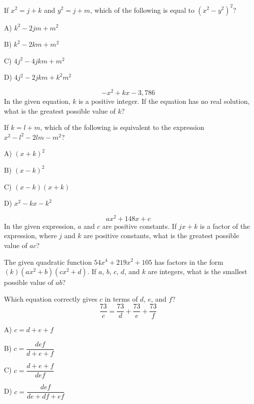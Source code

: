 \vfill
\noindent\begin{minipage}{\linewidth}
\par\smallskip
If $x^2=j+k$ and $y^2=j+m$, which of the following is equal to $(x^2-y^2)^2$?
\begin{satchoices}
  \item[A)] $k^2-2jm+m^2$
  \item[B)] $k^2-2km+m^2$
  \item[C)] $4j^2-4jkm+m^2$
  \item[D)] $4j^2-2jkm+k^2m^2$
\end{satchoices}
\end{minipage}
\vfill
\clearpage
\noindent\begin{minipage}{\linewidth}
\par\smallskip
$$-x^2+kx-3{,}786$$ In the given equation, $k$ is a positive integer. If the equation has no real solution, what is the greatest possible value of $k$?
\end{minipage}
\vfill
\noindent\begin{minipage}{\linewidth}
\par\smallskip
If $k=l+m$, which of the following is equivalent to the expression $x^2-l^2-2lm-m^2$?
\begin{satchoices}
  \item[A)] $(x+k)^2$
  \item[B)] $(x-k)^2$
  \item[C)] $(x-k)(x+k)$
  \item[D)] $x^2-kx-k^2$
\end{satchoices}
\end{minipage}
\vfill
\noindent\begin{minipage}{\linewidth}
\par\smallskip
$$ax^2+148x+c$$ In the given expression, $a$ and $c$ are positive constants. If $jx+k$ is a factor of the expression, where $j$ and $k$ are positive constants, what is the greatest possible value of $ac$?
\end{minipage}
\vfill
\clearpage
\noindent\begin{minipage}{\linewidth}
\par\smallskip
The given quadratic function $54x^4+219x^2+105$ has factors in the form $(k)(ax^2+b)(cx^2+d)$. If $a$, $b$, $c$, $d$, and $k$ are integers, what is the smallest possible value of $ab$?
\end{minipage}
\vfill
\noindent\begin{minipage}{\linewidth}
\par\smallskip
Which equation correctly gives $c$ in terms of $d$, $e$, and $f$? $$\frac{73}{c}=\frac{73}{d}+\frac{73}{e}+\frac{73}{f}$$
\begin{satchoices}
  \item[A)] $c=d+e+f$
  \item[B)] $c=\dfrac{def}{d+e+f}$
  \item[C)] $c=\dfrac{d+e+f}{def}$
  \item[D)] $c=\dfrac{def}{de+df+ef}$
\end{satchoices}
\end{minipage}
